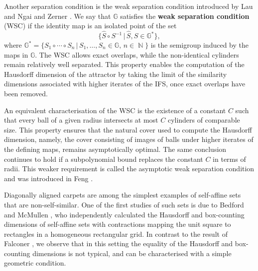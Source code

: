\documentclass[a4paper, 11pt]{article}
\DeclareMathOperator{\N}{\mathbb{N}}
\numberwithin{equation}{section}
\theoremstyle{plain}
\theoremstyle{remark}
\theoremstyle{definition}
\begin{document}
Another separation condition is the weak separation condition introduced by Lau and Ngai \cite{LAU199945} and Zerner \cite{MR1343732}. We say that $\mathbb{G}$ satisfies the \textbf{weak separation condition} (WSC) if the identity map is an isolated point of the set
$$
\big\{\hat{S}\circ S^{-1}\, \big|\, \hat{S},S\in\mathbb{G}^*\big\},
$$
where $\mathbb{G}^*=\{S_1\circ\cdots\circ S_n\, |\,S_1,\ldots,S_n\in\mathbb{G},\, n\in\N\}$ is the semigroup induced by the maps in $\mathbb{G}$. The WSC allows exact overlaps, while the non-identical cylinders remain relatively well separated. This property enables the computation of the Hausdorff dimension of the attractor by taking the limit of the similarity dimensions associated with higher iterates of the IFS, once exact overlaps have been removed.

An equivalent characterisation of the WSC is the existence of a constant $C$ such that every ball of a given radius intersects at most $C$ cylinders of comparable size. This property ensures that the natural cover used to compute the Hausdorff dimension, namely, the cover consisting of images of balls under higher iterates of the defining maps, remains asymptotically optimal. The same conclusion continues to hold if a subpolynomial bound replaces the constant $C$ in terms of radii. This weaker requirement is called the asymptotic weak separation condition and was introduced in Feng \cite{MR2322179}.

Diagonally aligned carpets are among the simplest examples of self-affine sets that are non-self-similar. One of the first studies of such sets is due to Bedford \cite{bedford1984crinkly} and McMullen \cite{McMullen}, who independently calculated the Hausdorff and box-counting dimensions of self-affine sets with contractions mapping the unit square to rectangles in a homogeneous rectangular grid. In contrast to the result of Falconer \cite{Falconer1997}, we observe that in this setting the equality of the Hausdorff and box-counting dimensions is not typical, and can be characterised with a simple geometric condition.
\end{document}
